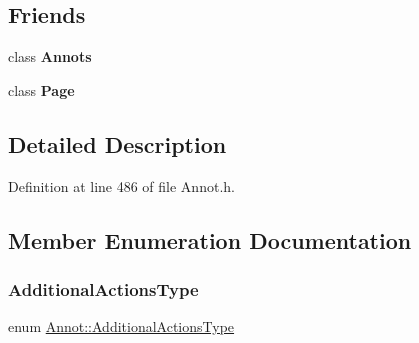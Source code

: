 \subsection*{Friends}
\begin{DoxyCompactItemize}
\item 
\mbox{\label{class_annot_aec7c08681ddec867c5edfbe85ff27f5b}} 
class {\bfseries Annots}
\item 
\mbox{\label{class_annot_a66d145c56e1747e0aecb5309042ab183}} 
class {\bfseries Page}
\end{DoxyCompactItemize}


\subsection{Detailed Description}


Definition at line 486 of file Annot.\+h.



\subsection{Member Enumeration Documentation}
\mbox{\label{class_annot_aee99d73d7beb3a7aef74f6bc68cc797f}} 
\subsubsection{\texorpdfstring{Additional\+Actions\+Type}{AdditionalActionsType}}
{\footnotesize\ttfamily enum \hyperlink{class_annot_aee99d73d7beb3a7aef74f6bc68cc797f}{Annot\+::\+Additional\+Actions\+Type}}

